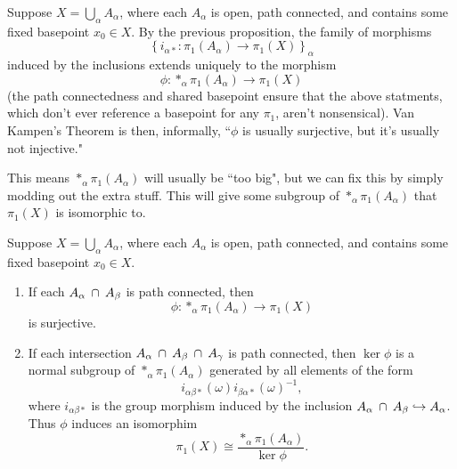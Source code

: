 \documentclass[twoside,10pt]{report}
\begin{document}
Suppose $X = \bigcup_{\alpha}A_{\alpha}$, where each $A_{\alpha}$ is open, path connected, and contains some fixed basepoint $x_0 \in X$. By the previous proposition, the family of morphisms
\[
	\left\{ i_{\alpha *}:\pi_1(A_{\alpha}) \to \pi_1(X) \right\}_{\alpha}
\] induced by the inclusions extends uniquely to the morphism
\[
	\phi:*_{\alpha}\pi_1(A_{\alpha}) \to \pi_1(X)
\] (the path connectedness and shared basepoint ensure that the above statments, which don't ever reference a basepoint for any $\pi_1$, aren't nonsensical). Van Kampen's Theorem is then, informally, ``$\phi$ is usually surjective, but it's usually not injective."

This means $*_{\alpha}\pi_1(A_{\alpha})$ will usually be ``too big", but we can fix this by simply modding out the extra stuff. This will give some subgroup of $*_{\alpha}\pi_1(A_{\alpha})$ that $\pi_1(X)$ is isomorphic to.

\begin{thrm}
	Suppose $X = \bigcup_{\alpha}A_{\alpha}$, where each $A_{\alpha}$ is open, path connected, and contains some fixed basepoint $x_0 \in X$.
	\begin{enumerate}
		\item If each $A_{\alpha}\operatorname{\;\cap\;} A_{\beta}$ is path connected, then
			\[
				\phi: *_{\alpha}\pi_1(A_{\alpha}) \to \pi_1(X)
			\] is surjective.
		\item If each intersection $A_{\alpha}\operatorname{\;\cap\;} A_{\beta} \operatorname{\;\cap\;} A_{\gamma}$ is path connected, then $\ker \phi$ is a normal subgroup of $*_{\alpha}\pi_1(A_{\alpha})$ generated by all elements of the form
			\[
				i_{\alpha\beta*}(\omega) i_{\beta\alpha*}(\omega)^{-1},
			\] where $i_{\alpha\beta*}$ is the group morphism induced by the inclusion $A_{\alpha}\operatorname{\;\cap\;} A_{\beta} \hookrightarrow A_{\alpha}$. Thus $\phi$ induces an isomorphim 
			\[
				\pi_1(X) \cong \frac{*_{\alpha}\pi_1(A_{\alpha})}{\ker \phi} .
			\] 
	\end{enumerate}
\end{thrm}
\end{document}
